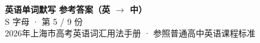 \documentclass[10pt,a4paper]{article}
\begin{document}
\pagestyle{plain}

\begin{center}
{\LARGE\bfseries 英语单词默写 \quad 参考答案（英 $\to$ 中）}\\[0.22em]
{\large S 字母 · 第 5 / 9 份}\\[0.18em]
{\small 2026年上海市高考英语词汇用法手册 · 参照普通高中英语课程标准}
\end{center}

\vspace{0.2em}
\noindent{\color{rulegray}\rule{\textwidth}{0.8pt}}

\vspace{0.35em}

\vspace{0.25em}
\renewcommand{\arraystretch}{1.32}
\end{document}

